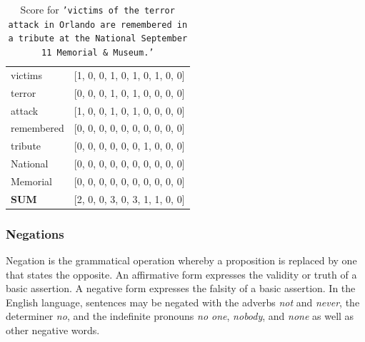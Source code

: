 \documentclass[
10pt, %
a4paper, %
oneside, %
headinclude,footinclude, %
BCOR5mm, %
]{scrartcl}
\begin{document}
\begin{table}[hbt]
\centering


\begin{tabular}{ll}

victims                            & {[}1, 0, 0, 1, 0, 1, 0, 1, 0, 0{]}                               \\
terror                             & {[}0, 0, 0, 1, 0, 1, 0, 0, 0, 0{]}                               \\
attack                             & {[}1, 0, 0, 1, 0, 1, 0, 0, 0, 0{]}                               \\
remembered                         & {[}0, 0, 0, 0, 0, 0, 0, 0, 0, 0{]}                               \\
tribute                            & {[}0, 0, 0, 0, 0, 0, 1, 0, 0, 0{]}                               \\
National                           & {[}0, 0, 0, 0, 0, 0, 0, 0, 0, 0{]}                               \\
Memorial                           & {[}0, 0, 0, 0, 0, 0, 0, 0, 0, 0{]}                               \\ \hline
\textbf{SUM} & {[}2, 0, 0, 3, 0, 3, 1, 1, 0, 0{]} \\ 
\end{tabular}
\caption{Score for \texttt{'victims of the terror attack in Orlando are remembered in a tribute at the National September 11 Memorial \& Museum.'}}
\label{feature_lexicon}
\end{table}


\subsubsection{Negations}
Negation is the grammatical operation whereby a proposition is replaced by one that states the opposite. An affirmative form expresses the validity or truth of a basic assertion. A negative form expresses the falsity of a basic assertion. In the English language, sentences may be negated with the adverbs \textit{not} and \textit{never}, the determiner \textit{no}, and the indefinite pronouns \textit{no one}, \textit{nobody}, and \textit{none} as well as other negative words.
\end{document}
